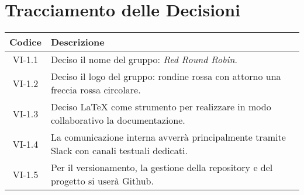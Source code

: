 \section*{Tracciamento delle Decisioni}

\begin{center}
	\begin{longtable}{|c|p{14.5cm}|}
	\hline
	\rowcolor{lighter-grayer}
	\textbf{Codice} & \textbf{Descrizione} \\
	\hline
	\endfirsthead

	\hline
	VI-1.1 & Deciso il nome del gruppo: \textit{Red Round Robin}. \\
	\hline
	VI-1.2 & Deciso il logo del gruppo: rondine rossa con attorno una freccia rossa circolare. \\
	\hline
	VI-1.3 & Deciso \LaTeX{} come strumento per realizzare in modo collaborativo la documentazione. \\
	\hline
	VI-1.4 & La comunicazione interna avverrà principalmente tramite Slack con canali testuali dedicati. \\
	\hline
	VI-1.5 & Per il versionamento, la gestione della repository e del progetto si userà Github. \\
	\hline

	\end{longtable}
\end{center}
